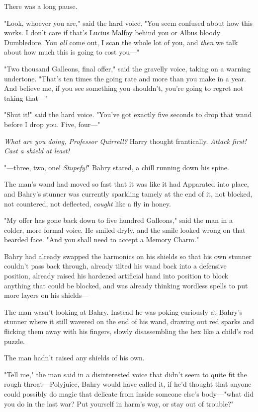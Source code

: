There was a long pause.

"Look, whoever you are," said the hard voice. "You seem confused about how this
works. I don't care if that's Lucius Malfoy behind you or Albus bloody
Dumbledore. You \emph{all} come out, I scan the whole lot of you, and
\emph{then} we talk about how much this is going to cost you\mbox{---}"

"Two thousand Galleons, final offer," said the gravelly voice, taking on a
warning undertone. "That's ten times the going rate and more than you make in a
year. And believe me, if you see something you shouldn't, you're going to
regret not taking that\mbox{---}"

"Shut it!" said the hard voice. "You've got exactly five seconds to drop that
wand before I drop you. Five, four\mbox{---}"

\emph{What are you doing, Professor Quirrell?} Harry thought frantically.
\emph{Attack first! Cast a shield at least!}

"---three, two, one! \emph{Stupefy!}"
\sbreak
Bahry stared, a chill running down his spine.

The man's wand had moved so fast that it was like it had Apparated into place,
and Bahry's stunner was currently sparkling tamely at the end of it, not
blocked, not countered, not deflected, \emph{caught} like a fly in honey.

"My offer has gone back down to five hundred Galleons," said the man in a
colder, more formal voice. He smiled dryly, and the smile looked wrong on that
bearded face. "And you shall need to accept a Memory Charm."

Bahry had already swapped the harmonics on his shields so that his own stunner
couldn't pass back through, already tilted his wand back into a defensive
position, already raised his hardened artificial hand into position to block
anything that could be blocked, and was already thinking wordless spells
to put more layers on his shields---

The man wasn't looking at Bahry. Instead he was poking curiously at Bahry's
stunner where it still wavered on the end of his wand, drawing out red sparks
and flicking them away with his fingers, slowly disassembling the hex like a
child's rod puzzle.

The man hadn't raised any shields of his own.

"Tell me," the man said in a disinterested voice that didn't seem to quite fit
the rough throat---Polyjuice, Bahry would have called it, if he'd thought that
anyone could possibly do magic that delicate from inside someone else's
body\mbox{---}"what did you do in the last war? Put yourself in harm's way, or stay
out of trouble?"

